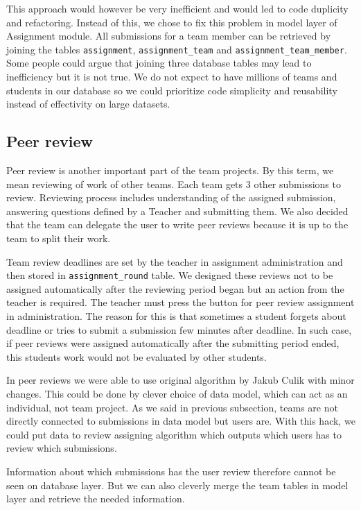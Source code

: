 This approach would however be very inefficient and would led to code duplicity and refactoring. Instead of this, we chose to fix this problem in model layer of Assignment module. All submissions for a team member can be retrieved by joining the tables  \texttt{assignment}, \texttt{assignment\_team} and \texttt{assignment\_team\_member}. Some people could argue that joining three database tables may lead to inefficiency but it is not true. We do not expect to have millions of teams and students in our database so we could prioritize code simplicity and reusability instead of effectivity on large datasets.

\subsection{Peer review}
\label{sec:peerreview}
Peer review is another important part of the team projects. By this term, we mean reviewing of work of other teams. Each team gets 3 other submissions to review. Reviewing process includes understanding of the assigned submission, answering questions defined by a Teacher and submitting them. We also decided that the team can delegate the user to  write peer reviews because it is up to the team to split their work.

Team review deadlines are set by the teacher in assignment administration and then stored in \texttt{assignment\_round} table. We designed these reviews not to be assigned automatically after the reviewing period began but an action from the teacher is required. The teacher must press the button for peer review assignment in administration. The reason for this is that sometimes a student forgets about deadline or tries to submit a submission few minutes after deadline. In such case, if peer reviews were assigned automatically after the submitting period ended, this students work would not be evaluated by other students.

In peer reviews we were able to use original algorithm by Jakub Culik \cite{culik} with minor changes. This could be done by clever choice of data model, which can act as an individual, not team project. As we said in previous subsection, teams are not directly connected to submissions in data model but users are. With this hack, we could put data to review assigning algorithm which outputs which users has to review which submissions.

Information about which submissions has the user review therefore cannot be seen on database layer. But we can also cleverly merge the team tables in model layer and retrieve the needed information.

